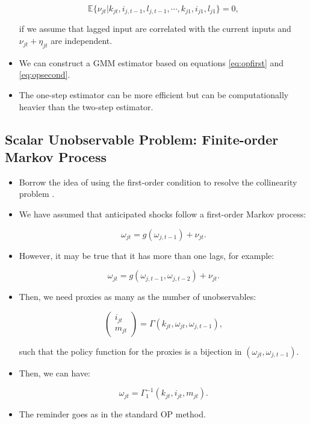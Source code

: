 \documentclass[]{book}
\providecommand{\tightlist}{%
  \setlength{\itemsep}{0pt}\setlength{\parskip}{0pt}}
\begin{document}
\begin{itemize}
  \begin{equation}
  \mathbb{E}\{\nu_{jt}|k_{jt}, i_{j, t - 1}, l_{j, t - 1}, \cdots, k_{j1}, i_{j1}, l_{j1}\} = 0,
  \end{equation}

  if we assume that lagged input are correlated with the current inputs
  and \(\nu_{jt} + \eta_{jt}\) are independent.
\item
  We can construct a GMM estimator based on equations \eqref{eq:opfirst}
  and \eqref{eq:opsecond}.
\item
  The one-step estimator can be more efficient but can be
  computationally heavier than the two-step estimator.
\end{itemize}

\subsection{Scalar Unobservable Problem: Finite-order Markov
Process}\label{scalar-unobservable-problem-finite-order-markov-process}

\begin{itemize}
\tightlist
\item
  Borrow the idea of using the first-order condition to resolve the
  collinearity problem \citep{Gandhi2017a}.
\item
  We have assumed that anticipated shocks follow a first-order Markov
  process:

  \begin{equation}
  \omega_{jt} = g(\omega_{j, t - 1}) + \nu_{jt}.
  \end{equation}
\item
  However, it may be true that it has more than one lags, for example:

  \begin{equation}
  \omega_{jt} = g(\omega_{j, t - 1}, \omega_{j, t - 2}) + \nu_{jt}.
  \end{equation}
\item
  Then, we need proxies as many as the number of unobservables:

  \begin{equation}
  \begin{pmatrix}
  i_{jt} \\ m_{jt} 
  \end{pmatrix}
  = \Gamma(k_{jt}, \omega_{jt}, \omega_{j, t - 1}),
  \end{equation}

  such that the policy function for the proxies is a bijection in
  \((\omega_{jt}, \omega_{j, t - 1})\).
\item
  Then, we can have:

  \begin{equation}
  \omega_{jt} = \Gamma_1^{-1}(k_{jt}, i_{jt}, m_{jt}).
  \end{equation}
\item
  The reminder goes as in the standard OP method.
\end{itemize}
\end{document}
